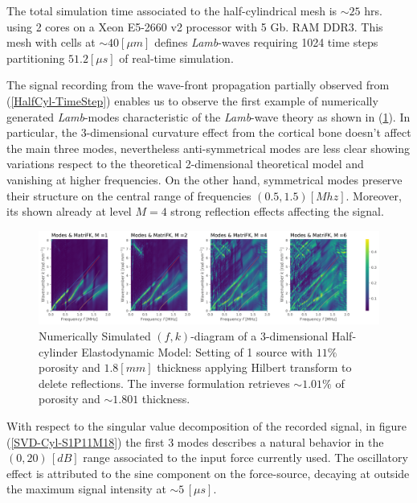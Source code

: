 \begin{rem}
The total simulation time associated to the half-cylindrical mesh is $\sim 25$ hrs. using 2 cores on a Xeon E5-2660 v2 processor with 5 Gb. RAM DDR3. This mesh with cells at $\sim 40 [\mu m]$ defines \textit{Lamb}-waves requiring 1024 time steps partitioning $51.2 [\mu s]$ of real-time simulation. 
\end{rem}

The signal recording from the wave-front propagation partially observed from (\ref{HalfCyl-TimeStep}) enables us to observe the first example of numerically generated \textit{Lamb}-modes characteristic of the \textit{Lamb}-wave theory as shown in (\ref{FK-Cyl-DiagramS1P11M18}). In particular, the 3-dimensional curvature effect from the cortical bone doesn't affect the main three modes, nevertheless anti-symmetrical modes are less clear showing variations respect to the theoretical 2-dimensional theoretical model and vanishing at higher frequencies. On the other hand, symmetrical modes preserve their structure on the central range of frequencies $(0.5, 1.5) [Mhz]$. Moreover, its shown already at level $M=4$ strong reflection effects affecting the signal.
\begin{figure}[!h]
	\centering
	\includegraphics[width=\textwidth]{images/ClusterSim/3DCylTimeP11TransIsoFKW18.pdf}
	\caption{Numerically Simulated $(f,k)$-diagram of a 3-dimensional Half-cylinder Elastodynamic Model: Setting of 1 source with $11\%$ porosity and $1.8 [mm]$ thickness applying Hilbert transform to delete reflections. The inverse formulation retrieves $\sim 1.01\%$ of porosity and $\sim 1.801$ thickness.}
	\label{FK-Cyl-DiagramS1P11M18}
\end{figure} 
With respect to the singular value decomposition of the recorded signal, in figure (\ref{SVD-Cyl-S1P11M18}) the first 3 modes describes a natural behavior in the $(0, 20) \, [dB]$ range associated to the input force currently used. The oscillatory effect is attributed to the sine component on the force-source, decaying at outside the maximum signal intensity at $\sim 5 \, [\mu s]$.
